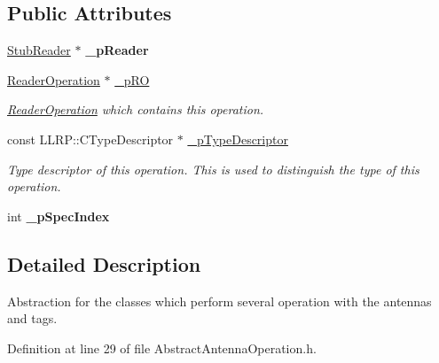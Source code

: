 \subsection*{Public Attributes}
\begin{DoxyCompactItemize}
\item 
\hypertarget{class_e_l_f_i_n_1_1_abstract_antenna_operation_ae5270b59e19921d9007164ab6c2b5618}{\hyperlink{class_e_l_f_i_n_1_1_stub_reader}{Stub\-Reader} $\ast$ {\bfseries \-\_\-p\-Reader}}\label{class_e_l_f_i_n_1_1_abstract_antenna_operation_ae5270b59e19921d9007164ab6c2b5618}

\item 
\hyperlink{class_e_l_f_i_n_1_1_reader_operation}{Reader\-Operation} $\ast$ \hyperlink{class_e_l_f_i_n_1_1_abstract_antenna_operation_ae874826eb74270191459a48fae5a4131}{\-\_\-p\-R\-O}
\begin{DoxyCompactList}\small\item\em \hyperlink{class_e_l_f_i_n_1_1_reader_operation}{Reader\-Operation} which contains this operation. \end{DoxyCompactList}\item 
const L\-L\-R\-P\-::\-C\-Type\-Descriptor $\ast$ \hyperlink{class_e_l_f_i_n_1_1_abstract_antenna_operation_ae656ecd50678637a29a66743ceda3e86}{\-\_\-p\-Type\-Descriptor}
\begin{DoxyCompactList}\small\item\em Type descriptor of this operation. This is used to distinguish the type of this operation. \end{DoxyCompactList}\item 
\hypertarget{class_e_l_f_i_n_1_1_abstract_antenna_operation_a6c7ad0c0401080c3542ef9a68c0b3b4d}{int {\bfseries \-\_\-p\-Spec\-Index}}\label{class_e_l_f_i_n_1_1_abstract_antenna_operation_a6c7ad0c0401080c3542ef9a68c0b3b4d}

\end{DoxyCompactItemize}


\subsection{Detailed Description}
Abstraction for the classes which perform several operation with the antennas and tags. 

Definition at line 29 of file Abstract\-Antenna\-Operation.\-h.



